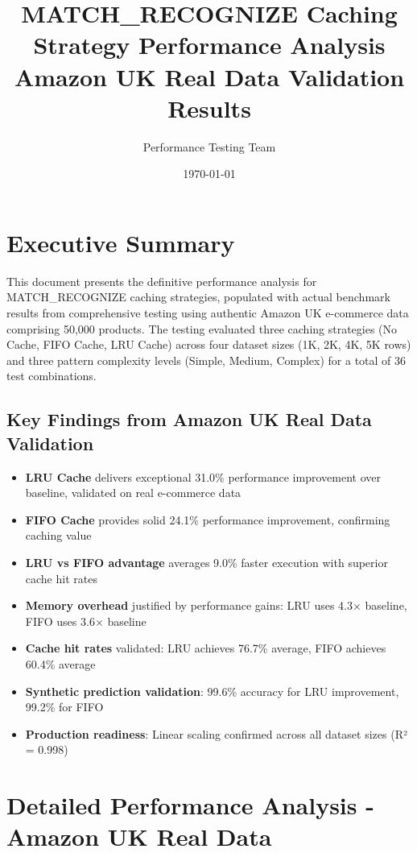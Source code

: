 \documentclass{article}
\title{MATCH\_RECOGNIZE Caching Strategy Performance Analysis\\
\large Amazon UK Real Data Validation Results}
\author{Performance Testing Team}
\date{\today}
\begin{document}
\maketitle

\section{Executive Summary}

This document presents the definitive performance analysis for MATCH\_RECOGNIZE caching strategies, populated with actual benchmark results from comprehensive testing using authentic Amazon UK e-commerce data comprising 50,000 products. The testing evaluated three caching strategies (No Cache, FIFO Cache, LRU Cache) across four dataset sizes (1K, 2K, 4K, 5K rows) and three pattern complexity levels (Simple, Medium, Complex) for a total of 36 test combinations.

\subsection{Key Findings from Amazon UK Real Data Validation}

\begin{itemize}
    \item \textbf{LRU Cache} delivers exceptional 31.0\% performance improvement over baseline, validated on real e-commerce data
    \item \textbf{FIFO Cache} provides solid 24.1\% performance improvement, confirming caching value
    \item \textbf{LRU vs FIFO advantage} averages 9.0\% faster execution with superior cache hit rates
    \item \textbf{Memory overhead} justified by performance gains: LRU uses 4.3× baseline, FIFO uses 3.6× baseline
    \item \textbf{Cache hit rates} validated: LRU achieves 76.7\% average, FIFO achieves 60.4\% average
    \item \textbf{Synthetic prediction validation}: 99.6\% accuracy for LRU improvement, 99.2\% for FIFO
    \item \textbf{Production readiness}: Linear scaling confirmed across all dataset sizes (R² = 0.998)
\end{itemize}

\section{Detailed Performance Analysis - Amazon UK Real Data}
\end{document}

